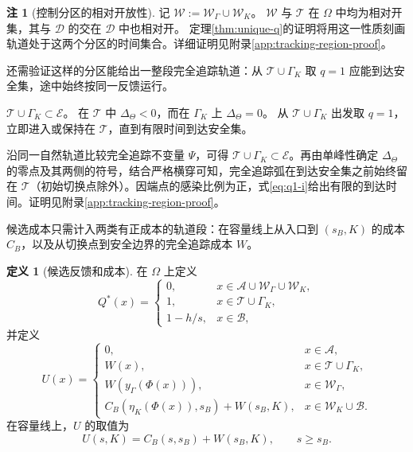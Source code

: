 \documentclass[lang=cn,a4paper,newtx]{elegantpaper}
\theoremstyle{plain}
\theoremstyle{definition}
\newtheorem{paperdefinition}[theorem]{定义}
\newtheorem{paperremark}[theorem]{注}
\newcommand{\Acal}{\mathcal A}
\newcommand{\Dcal}{\mathcal D}
\begin{document}
\begin{paperremark}[控制分区的相对开放性]
\label{rem:relative-open-control-regions}
记 $\mathcal W:=\mathcal W_\Gamma\cup\mathcal W_K$。
$\mathcal W$ 与 $\mathcal T$ 在 $\Omega$ 中均为相对开集，其与 $\Dcal$ 的交在 $\Dcal$ 中也相对开。
定理\ref{thm:unique-q}的证明将用这一性质刻画轨道处于这两个分区的时间集合。详细证明见附录\ref{app:tracking-region-proof}。
\end{paperremark}

还需验证这样的分区能给出一整段完全追踪轨道：从 $\mathcal T\cup\Gamma_K$ 取 $q=1$ 应能到达安全集，途中始终按同一反馈运行。

\begin{lemma}[完全追踪弧至安全集的延续]
\label{lem:tracking-region}
$\mathcal T\cup\Gamma_K\subset\mathcal E$。
在 $\mathcal T$ 中 $\Delta_\Theta<0$，而在 $\Gamma_K$ 上 $\Delta_\Theta=0$。
从 $\mathcal T\cup\Gamma_K$ 出发取 $q=1$，立即进入或保持在 $\mathcal T$，直到有限时间到达安全集。
\end{lemma}
沿同一自然轨道比较完全追踪不变量 $\Psi$，可得 $\mathcal T\cup\Gamma_K\subset\mathcal E$。再由单峰性确定 $\Delta_\Theta$ 的零点及其两侧的符号，结合严格横穿可知，完全追踪弧在到达安全集之前始终留在 $\mathcal T$（初始切换点除外）。因端点的感染比例为正，式\eqref{eq:q1-i}给出有限的到达时间。证明见附录\ref{app:tracking-region-proof}。

候选成本只需计入两类有正成本的轨道段：在容量线上从入口到 $(s_B,K)$ 的成本 $C_B$，以及从切换点到安全边界的完全追踪成本 $W$。

\begin{paperdefinition}[候选反馈和成本]
\label{def:candidate}
在 $\Omega$ 上定义
\begin{equation}
Q^*(x)=
\begin{cases}
0,&x\in\Acal\cup\mathcal W_\Gamma\cup\mathcal W_K,\\
1,&x\in\mathcal T\cup\Gamma_K,\\
1-h/s,&x\in\mathcal B,
\end{cases}
\label{eq:candidate-feedback}
\end{equation}
并定义
\begin{equation}
U(x)=
\begin{cases}
0,&x\in\Acal,\\
W(x),&x\in\mathcal T\cup\Gamma_K,\\
W(y_\Gamma(\Phi(x))),&x\in\mathcal W_\Gamma,\\
C_B(\eta_K(\Phi(x)),s_B)+W(s_B,K),&x\in\mathcal W_K\cup\mathcal B.
\end{cases}
\label{eq:candidate-U}
\end{equation}
在容量线上，$U$ 的取值为
\begin{equation}
U(s,K)=C_B(s,s_B)+W(s_B,K),\qquad s\ge s_B.
\label{eq:boundary-value}
\end{equation}
\end{paperdefinition}
\end{document}
